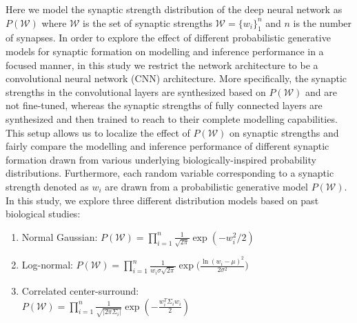 \documentclass[10pt,letterpaper]{article}
\newcommand{\zset}[1]{\big\{ #1 \big\}}
\begin{document}
Here we model the synaptic strength distribution of the deep neural network as $P(\mathcal{W})$ where $\mathcal{W}$ is the set of synaptic strengths $\mathcal{W} = \zset{w_i}_1^n$ and $n$ is the number of synapses. In order to explore the effect of different probabilistic generative models for synaptic formation on modelling and inference performance in a focused manner, in this study we restrict the network architecture to be a convolutional neural network (CNN) architecture. More specifically, the synaptic strengths in the convolutional layers are synthesized based on $P(\mathcal{W})$ and are not fine-tuned, whereas the synaptic strengths of fully connected layers are synthesized and then trained to reach to their complete modelling capabilities. This setup allows us to localize the effect of $P(\mathcal{W})$ on synaptic strengths and fairly compare the modelling and inference performance of different synaptic formation drawn from various underlying biologically-inspired probability distributions. Furthermore, each random variable corresponding to a synaptic strength denoted as $w_i$ are drawn from a probabilistic generative model $P(\mathcal{W})$. In this study, we explore three different distribution models based on past biological studies:

\begin{enumerate}[I]
  \itemsep0em
  \item Normal Gaussian: $ P(\mathcal{W}) = \prod_{i = 1}^n \frac{1}{\sqrt{2 \pi}} \exp( - w_i^2 / 2 ) $
  \item Log-normal: $ P(\mathcal{W}) = \prod_{i = 1}^n \frac{1}{w_i \sigma \sqrt{2 \pi}} \exp \Big( \frac{\ln(w_i - \mu) ^ 2}{2 \sigma ^ 2} \Big) $
  \item Correlated center-surround: \\ $ P(\mathcal{W}) = \prod_{i = 1}^n \frac{1}{\sqrt{|2 \pi \Sigma_i|}} \exp( - \frac{w_i^T \Sigma_i w_i}{2} ) $\footnotemark
\end{enumerate}


\end{document}
